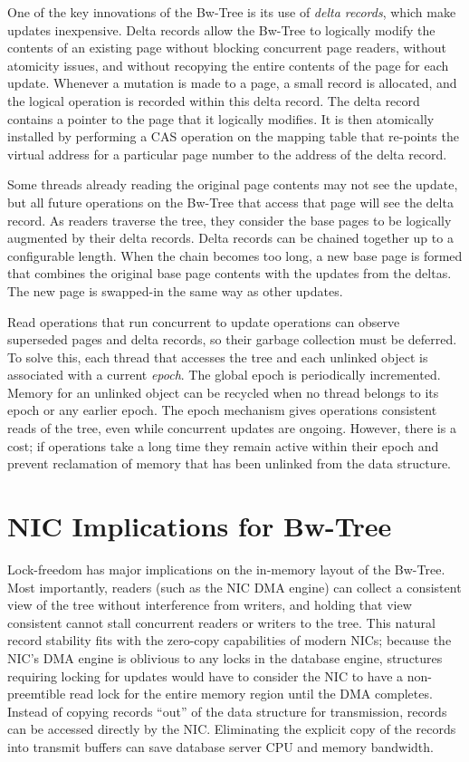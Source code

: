 One of the key innovations of the Bw-Tree is its use of {\em delta records},
which make updates inexpensive.
Delta records allow the Bw-Tree to logically modify the
contents of an existing page without blocking concurrent page readers, without
atomicity issues, and without recopying the entire contents of the page for
each update.  Whenever a mutation is made to a page, a small record is
allocated, and the logical operation is recorded within this delta record. The delta
record contains a pointer to the page that it logically modifies. It
is then atomically installed by performing a CAS operation on the
mapping table that re-points the virtual address for a particular page number
to the address of the delta record.

Some threads already reading the original page contents may not see
the update, but all future operations on the Bw-Tree that access that page
will see the delta record. As readers traverse the tree, they consider
the base pages to be logically augmented by their delta records. Delta records
can be chained together up to a configurable length.  When the chain becomes
too long, a new base page is formed that combines the original base page
contents with the updates from the deltas. The new page is swapped-in
the same way as other updates.

Read operations that run concurrent to update operations can observe superseded
pages and delta records, so their garbage collection must be deferred.
To solve this, each thread that
accesses the tree and each unlinked object is associated with a current {\em epoch}.
The global epoch is periodically incremented. Memory for an unlinked object can be
recycled when no thread belongs to its epoch or any earlier epoch.
The epoch mechanism gives operations consistent reads of the
tree, even while concurrent updates are ongoing. However, there is a
cost; if operations take a long time they remain active within their epoch and
prevent reclamation of memory that has been unlinked from the data structure.

\section{NIC Implications for Bw-Tree}

Lock-freedom has major implications on the in-memory layout of the
Bw-Tree. Most importantly, readers (such as the NIC DMA engine) can collect a
consistent view of the tree without interference from writers, and holding that
view consistent cannot stall concurrent readers or writers to the tree.  This
natural record stability fits with the zero-copy capabilities of modern NICs;
because the NIC's DMA engine is oblivious to any locks in the database engine,
structures requiring locking for updates would have to consider the NIC to
have a non-preemtible read lock for the entire memory region until the DMA completes.
Instead of copying records ``out'' of the data structure for transmission,
records can be accessed directly by the NIC. Eliminating the explicit copy of
the records into transmit buffers can save database server CPU and memory
bandwidth.

